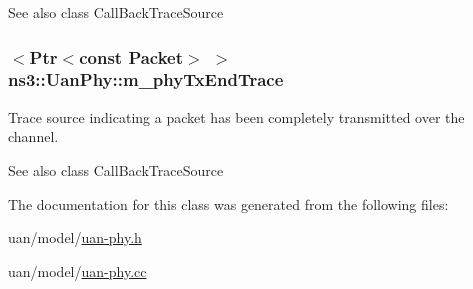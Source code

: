 \begin{DoxySeeAlso}{See also}
class Call\+Back\+Trace\+Source 
\end{DoxySeeAlso}
\subsubsection[{\texorpdfstring{m\+\_\+phy\+Tx\+End\+Trace}{m_phyTxEndTrace}}]{$<${\bf Ptr}$<$const {\bf Packet}$>$ $>$ ns3\+::\+Uan\+Phy\+::m\+\_\+phy\+Tx\+End\+Trace\hspace{0.3cm}{\ttfamily [private]}}\hypertarget{classns3_1_1UanPhy_a8cc06e8706afacf7b9021df62599e560}{}\label{classns3_1_1UanPhy_a8cc06e8706afacf7b9021df62599e560}
Trace source indicating a packet has been completely transmitted over the channel.

\begin{DoxySeeAlso}{See also}
class Call\+Back\+Trace\+Source 
\end{DoxySeeAlso}


The documentation for this class was generated from the following files\+:\begin{DoxyCompactItemize}
\item 
uan/model/\hyperlink{uan-phy_8h}{uan-\/phy.\+h}\item 
uan/model/\hyperlink{uan-phy_8cc}{uan-\/phy.\+cc}\end{DoxyCompactItemize}
